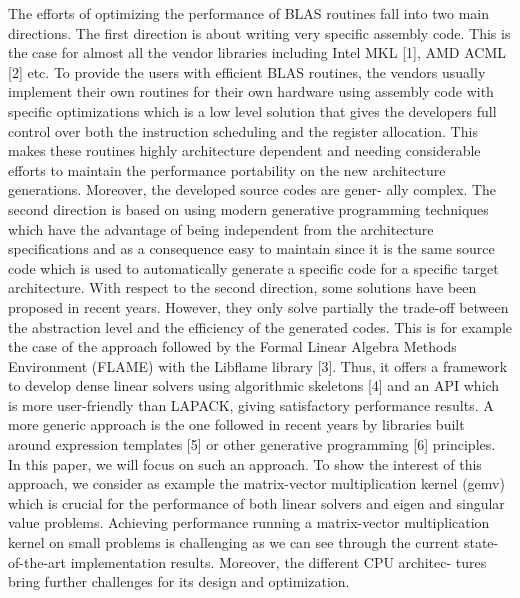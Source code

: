 \documentclass[../../main.tex]{subfiles}
\begin{document}
The efforts of optimizing the performance of BLAS routines
fall into two main directions. The first direction is about
writing very specific assembly code. This is the case for
almost all the vendor libraries including Intel MKL [1], AMD
ACML [2] etc. To provide the users with efficient BLAS
routines, the vendors usually implement their own routines
for their own hardware using assembly code with specific
optimizations which is a low level solution that gives the
developers full control over both the instruction scheduling
and the register allocation. This makes these routines highly
architecture dependent and needing considerable efforts to
maintain the performance portability on the new architecture
generations. Moreover, the developed source codes are gener-
ally complex. The second direction is based on using modern
generative programming techniques which have the advantage
of being independent from the architecture specifications and
as a consequence easy to maintain since it is the same source
code which is used to automatically generate a specific code
for a specific target architecture. With respect to the second
direction, some solutions have been proposed in recent years.
However, they only solve partially the trade-off between the
abstraction level and the efficiency of the generated codes.
This is for example the case of the approach followed by
the Formal Linear Algebra Methods Environment (FLAME)
with the Libflame library [3]. Thus, it offers a framework to
develop dense linear solvers using algorithmic skeletons [4]
and an API which is more user-friendly than LAPACK, giving
satisfactory performance results. A more generic approach is
the one followed in recent years by \cpp libraries built around
expression templates [5] or other generative programming [6]
principles. In this paper, we will focus on such an approach.
To show the interest of this approach, we consider as
example the matrix-vector multiplication kernel (gemv) which
is crucial for the performance of both linear solvers and eigen
and singular value problems. Achieving performance running
a matrix-vector multiplication kernel on small problems is
challenging as we can see through the current state-of-the-art
implementation results. Moreover, the different CPU architec-
tures bring further challenges for its design and optimization.
\end{document}
